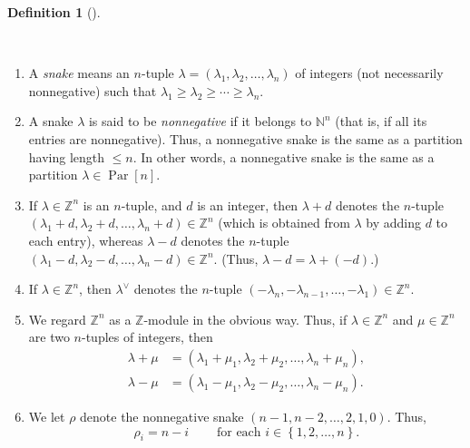 \documentclass[numbers=enddot,12pt,final,onecolumn,notitlepage]{scrartcl}%
\theoremstyle{definition}
\newtheorem{defi}[theo]{Definition}
\newenvironment{definition}[1][]
{\begin{defi}[#1]\begin{leftbar}}
{\end{leftbar}\end{defi}}
\begin{document}
\begin{definition}
\label{def.snakes}\ \ 

\begin{enumerate}
\item[\textbf{(a)}] A \emph{snake} means an $n$-tuple $\lambda=\left(
\lambda_{1},\lambda_{2},\ldots,\lambda_{n}\right)  $ of integers (not
necessarily nonnegative) such that $\lambda_{1}\geq\lambda_{2}\geq\cdots
\geq\lambda_{n}$.

\item[\textbf{(b)}] A snake $\lambda$ is said to be \emph{nonnegative} if it
belongs to $\mathbb{N}^{n}$ (that is, if all its entries are nonnegative).
Thus, a nonnegative snake is the same as a partition having length $\leq n$.
In other words, a nonnegative snake is the same as a partition $\lambda
\in\operatorname*{Par}\left[  n\right]  $.

\item[\textbf{(c)}] If $\lambda\in\mathbb{Z}^{n}$ is an $n$-tuple, and $d$ is
an integer, then $\lambda+d$ denotes the $n$-tuple $\left(  \lambda
_{1}+d,\lambda_{2}+d,\ldots,\lambda_{n}+d\right)  \in\mathbb{Z}^{n}$ (which is
obtained from $\lambda$ by adding $d$ to each entry), whereas $\lambda-d$
denotes the $n$-tuple $\left(  \lambda_{1}-d,\lambda_{2}-d,\ldots,\lambda
_{n}-d\right)  \in\mathbb{Z}^{n}$. (Thus, $\lambda-d=\lambda+\left(
-d\right)  $.)

\item[\textbf{(d)}] If $\lambda\in\mathbb{Z}^{n}$, then $\lambda^{\vee}$
denotes the $n$-tuple $\left(  -\lambda_{n},-\lambda_{n-1},\ldots,-\lambda
_{1}\right)  \in\mathbb{Z}^{n}$.

\item[\textbf{(e)}] We regard $\mathbb{Z}^{n}$ as a $\mathbb{Z}$-module in the
obvious way. Thus, if $\lambda\in\mathbb{Z}^{n}$ and $\mu\in\mathbb{Z}^{n}$
are two $n$-tuples of integers, then
\begin{align*}
\lambda+\mu &  =\left(  \lambda_{1}+\mu_{1},\lambda_{2}+\mu_{2},\ldots
,\lambda_{n}+\mu_{n}\right)  ,\\
\lambda-\mu &  =\left(  \lambda_{1}-\mu_{1},\lambda_{2}-\mu_{2},\ldots
,\lambda_{n}-\mu_{n}\right)  .
\end{align*}


\item[\textbf{(f)}] We let $\rho$ denote the nonnegative snake $\left(
n-1,n-2,\ldots,2,1,0\right)  $. Thus,%
\begin{equation}
\rho_{i}=n-i\ \ \ \ \ \ \ \ \ \ \text{for each }i\in\left\{  1,2,\ldots
,n\right\}  . \label{eq.snakes.f.rhoi=}%
\end{equation}

\end{enumerate}
\end{definition}
\end{document}
